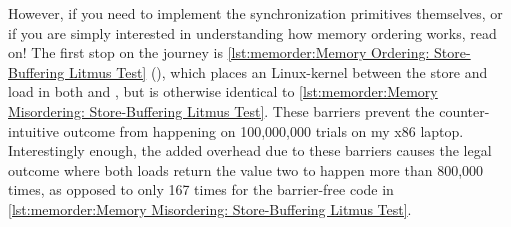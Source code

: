 However, if you need to implement the synchronization primitives
themselves, or if you are simply interested in understanding how memory
ordering works, read on!
The first stop on the journey is
\cref{lst:memorder:Memory Ordering: Store-Buffering Litmus Test}
(),
which places an  Linux-kernel  between
the store and load in both  and , but is otherwise
identical to
\cref{lst:memorder:Memory Misordering: Store-Buffering Litmus Test}.
These barriers prevent the counter-intuitive outcome from happening
on 100,000,000 trials on my x86 laptop.
Interestingly enough, the added overhead due to these barriers causes the
legal outcome where both loads return the value two to happen more
than 800,000 times, as opposed to only 167 times for the
barrier-free code in
\cref{lst:memorder:Memory Misordering: Store-Buffering Litmus Test}.

\begin{table}
\renewcommand*{\arraystretch}{1.1}
\small
\centering\OneColumnHSpace{-0.1in}
\caption{Memory Ordering:
			  Store-Buffering Sequence of Events}
\label{tab:memorder:Memory Ordering: Store-Buffering Sequence of Events}
\end{table}

